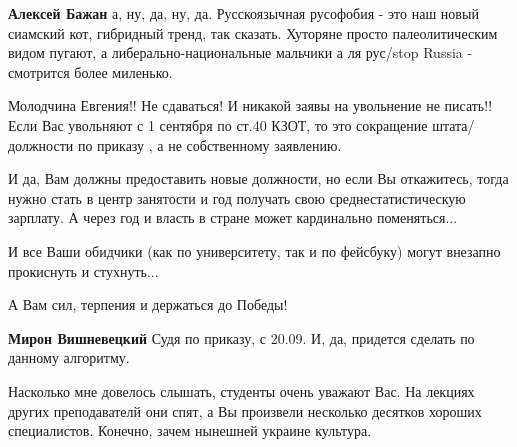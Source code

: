 \begin{itemize}
\begin{itemize}
\textbf{Алексей Бажан} а, ну, да, ну, да. Русскоязычная русофобия - это наш новый сиамский кот, гибридный тренд, так сказать. Хуторяне просто палеолитическим видом пугают, а либерально-национальные мальчики а ля рус/stop Russia - смотрится более миленько.

\end{itemize}

 

Молодчина Евгения!! Не сдаваться! И никакой заявы на увольнение не писать!!
Если Вас увольняют с 1 сентября по ст.40 КЗОТ, то это сокращение
штата/должности по приказу , а не собственному заявлению.

И да, Вам должны предоставить новые должности, но если Вы откажитесь, тогда
нужно стать в центр занятости и год получать свою среднестатистическую
зарплату. А через год и власть в стране может кардинально поменяться...

И все Ваши обидчики (как по университету, так и по фейсбуку) могут внезапно
прокиснуть и стухнуть...

А Вам сил, терпения и держаться до Победы!

\begin{itemize}
 
\textbf{Мирон Вишневецкий} Судя по приказу, с 20.09. И, да, придется сделать по данному алгоритму.
\end{itemize}

 

Насколько мне довелось слышать, студенты очень уважают Вас. На лекциях других
преподавателй они спят, а Вы произвели несколько десятков хороших специалистов.
Конечно, зачем нынешней украине культура.

\begin{itemize}
 

\end{itemize}
\end{itemize}
